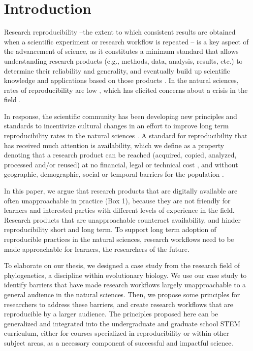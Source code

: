 \documentclass[12pt]{article}
\begin{document}
\newpage
{} %
\section*{Introduction}
\label{sec:intro}

Research reproducibility --the extent to which consistent results are obtained when
a scientific experiment or research workflow is repeated \citep{repdef2021}--
is a key aspect of the advancement
of science, as it constitutes a minimum standard that allows understanding research products
(e.g., methods, data, analysis, results, etc.)
to determine their reliability and generality, and eventually build up scientific
knowledge and applications based on those products
\citep{king1995replication, peng2011reproducible, powers2019open}.
In the natural sciences, rates of reproducibility are low \citep{ioannidis2005most, prinz2011believe},
which has elicited concerns about a crisis in the field \citep{baker2016reproducibility}.

In response, the scientific community has been developing new principles and standards to incentivize
cultural changes in an effort to improve long term reproducibility rates in the natural sciences
\citep{peng2015reproducibility, wilkinson2016fair}.
A standard for reproducibility that has received much attention is availability, which
we define as a property denoting that a research product can be reached (acquired, copied, analyzed,
processed and/or reused) at no financial, legal or technical cost \citep{arnold2019turing},
and without geographic, demographic, social or temporal barriers for the population \citep{fecher2014open}.

In this paper, we argue that research products that are digitally available are
often unapproachable in practice (Box 1), because they are not
friendly for learners and interested parties with different levels of
experience in the field. Research products that are unapproachable
counteract availability, and hinder reproducibility short and long term.
To support long term adoption of reproducible practices in the natural sciences, research
workflows need to be made approachable for learners, the researchers of the future.

To elaborate on our thesis, we designed a case study from the research field of
phylogenetics, a discipline within evolutionary biology.
We use our case study to identify barriers that have made research workflows
largely unapproachable to a general audience in the natural sciences.
Then, we propose some principles for researchers to address these barriers, and
create research workflows that are reproducible by a larger audience.
The principles proposed here can be generalized and integrated into the undergraduate
and graduate school STEM curriculum, either for courses specialized in reproducibility
or within other subject areas, as a necessary component of successful and impactful science.
\end{document}
